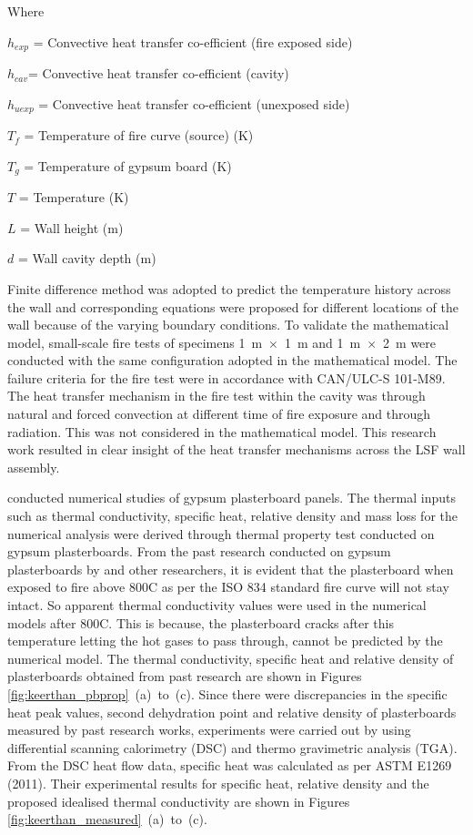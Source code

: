 Where
\begin{description}[itemsep=0pt,parsep=0pt]
	\item $ h_{exp} $ = Convective heat transfer co-efficient (fire exposed side)
	\item $ h_{cav} $= Convective heat transfer co-efficient (cavity) 
	\item $ h_{u exp} $ = Convective heat transfer co-efficient (unexposed side) 
	\item $ T_f $ = Temperature of fire curve (source) (\degree K)
	\item $ T_g $ = Temperature of gypsum board (\degree K)
	\item $T$ = Temperature (\degree K)
	\item $L$ = Wall height (m)
	\item $d$ = Wall cavity depth (m)
\end{description}
Finite difference method was adopted to predict the temperature history across the wall and corresponding equations were proposed for different locations of the wall because of the varying boundary conditions. To validate the mathematical model, small-scale fire tests of specimens 1~m~$\times$~1~m and 1~m~$\times$~2~m were conducted with the same configuration adopted in the mathematical model. The failure criteria for the fire test were in accordance with CAN/ULC-S 101-M89. The heat transfer mechanism in the fire test within the cavity was through natural and forced convection at different time of fire exposure and through radiation. This was not considered in the mathematical model. This research work resulted in clear insight of the heat transfer mechanisms across the LSF wall assembly. 

\citet{Keerthan2012a} conducted numerical studies of gypsum plasterboard panels. The thermal inputs such as thermal conductivity, specific heat, relative density and mass loss for the numerical analysis were derived through thermal property test conducted on gypsum plasterboards. From the past research conducted on gypsum plasterboards by \citet{Mehaffey1994,Sultan1996} and other researchers, it is evident that the plasterboard when exposed to fire above 800\degree C as per the ISO 834 standard fire curve will not stay intact. So apparent thermal conductivity values were used in the numerical models after 800\degree C. This is because, the plasterboard cracks after this temperature letting the hot gases to pass through, cannot be predicted by the numerical model. The thermal conductivity, specific heat and relative density of plasterboards obtained from past research are shown in Figures \ref{fig:keerthan_pbprop}~(a)~to~(c). Since there were discrepancies in the specific heat peak values, second dehydration point and relative density of plasterboards measured by past research works, experiments were carried out by \citet{Keerthan2012} using differential scanning calorimetry (DSC) and thermo gravimetric analysis (TGA). From the DSC heat flow data, specific heat was calculated as per ASTM E1269 (2011). Their experimental results for specific heat, relative density and the proposed idealised thermal conductivity are shown in Figures \ref{fig:keerthan_measured}~(a)~to~(c).

